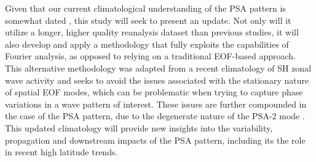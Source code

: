 Given that our current climatological understanding of the PSA pattern is somewhat dated \citep{Mo1998,Mo2001}, this study will seek to present an update. Not only will it utilize a longer, higher quality reanalysis dataset than previous studies, it will also develop and apply a methodology that fully exploits the capabilities of Fourier analysis, as opposed to relying on a traditional EOF-based approach. This alternative methodology was adapted from a recent climatology of SH zonal wave activity \citep{IrvingSimmonds2015} and seeks to avoid the issues associated with the stationary nature of spatial EOF modes, which can be problematic when trying to capture phase variations in a wave pattern of interest. These issues are further compounded in the case of the PSA pattern, due to the degenerate \citep{North1982} nature of the PSA-2 mode \citep[e.g. Figure 1;][]{Mo2000}. This updated climatology will provide new insights into the variability, propagation and downstream impacts of the PSA pattern, including its the role in recent high latitude trends. 

